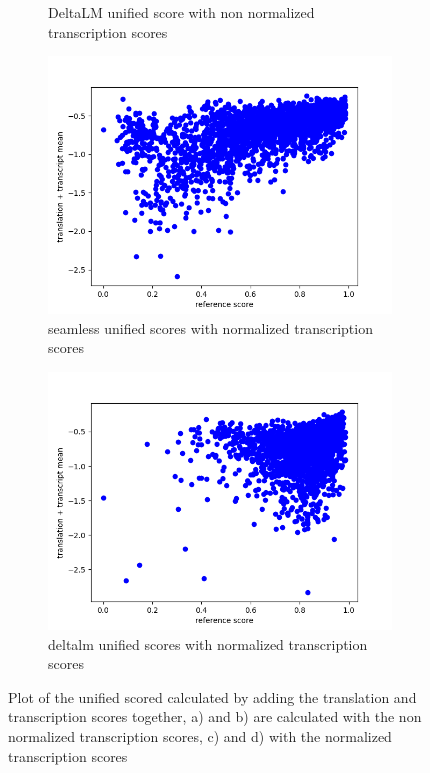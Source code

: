\begin{figure}[ht]
\begin{subfigure}{0.4\textwidth}
        \caption{DeltaLM unified score with non normalized transcription scores}
    \end{subfigure}
    \begin{subfigure}{0.4\textwidth}
        \includegraphics[width=\linewidth]{Latex/sections/images/seamlesstranscripttranslationmean.png}
        \caption{seamless unified scores with normalized transcription scores}
    \end{subfigure}
    \begin{subfigure}{0.4\textwidth}
        \includegraphics[width=\linewidth]{Latex/sections/images/dlmtranscripttranslationmean.png}
        \caption{deltalm unified scores with normalized transcription scores}
    \end{subfigure}
    \caption{Plot of the unified scored calculated by adding the translation and transcription scores together, a) and b) are calculated with the non normalized transcription scores, c) and d) with the normalized transcription scores}
    \label{fig:uniscore add plot}
\end{figure}

